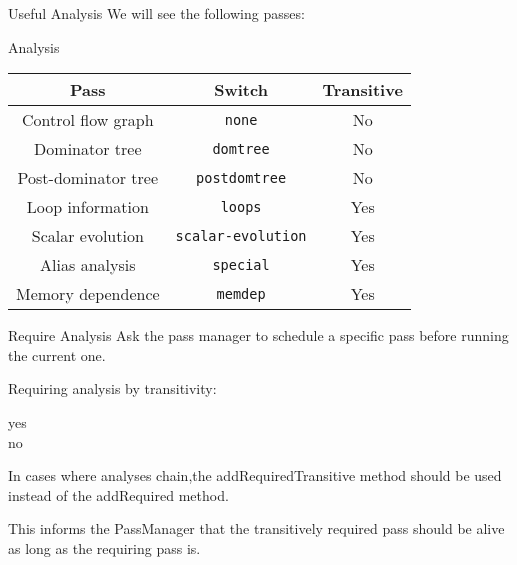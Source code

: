 \documentclass[10pt,mathserif]{beamer}
\begin{document}
\begin{frame}{Useful Analysis}
We will see the following passes:

\begin{block}{Analysis}
\centering
\begin{tabular}{ccc}
\toprule

\multicolumn{1}{c}{\textbf{Pass}}        &
\multicolumn{1}{c}{\textbf{Switch}}      &
\multicolumn{1}{c}{\textbf{Transitive}} \\

\midrule

Control flow graph  &
\texttt{none}       &
No                 \\

Dominator tree    &
\texttt{domtree}  &
No               \\

Post-dominator tree   &
\texttt{postdomtree}  &
No                   \\

Loop information  &
\texttt{loops}    &
Yes              \\

Scalar evolution           &
\texttt{scalar-evolution}  &
Yes                       \\

Alias analysis    &
\texttt{special}  &
Yes              \\

Memory dependence  &
\texttt{memdep}    &
Yes               \\

\bottomrule
\end{tabular}
\end{block}
\end{frame}

\begin{frame}{Require Analysis}
Ask the pass manager to schedule a specific pass
before running the current one.

\vfill
Requiring analysis by transitivity:
\begin{description}
\item[yes] 
\item[no] 
\end{description}

\vfill
In cases where \alert{analyses chain},the addRequiredTransitive method
should be used instead of the addRequired method.

This informs the PassManager that the transitively required pass
should be alive as long as the requiring pass is.
\end{frame}
\end{document}
